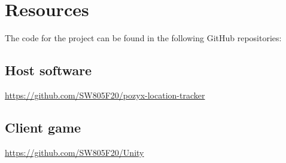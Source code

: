 \chapter{Resources}\label{resources}
The code for the project can be found in the following GitHub repositories:

\section*{Host software}
\hyperlink{https://github.com/SW805F20/pozyx-location-tracker}{https://github.com/SW805F20/pozyx-location-tracker}

\section*{Client game}
\hyperlink{https://github.com/SW805F20/Unity}{https://github.com/SW805F20/Unity}
